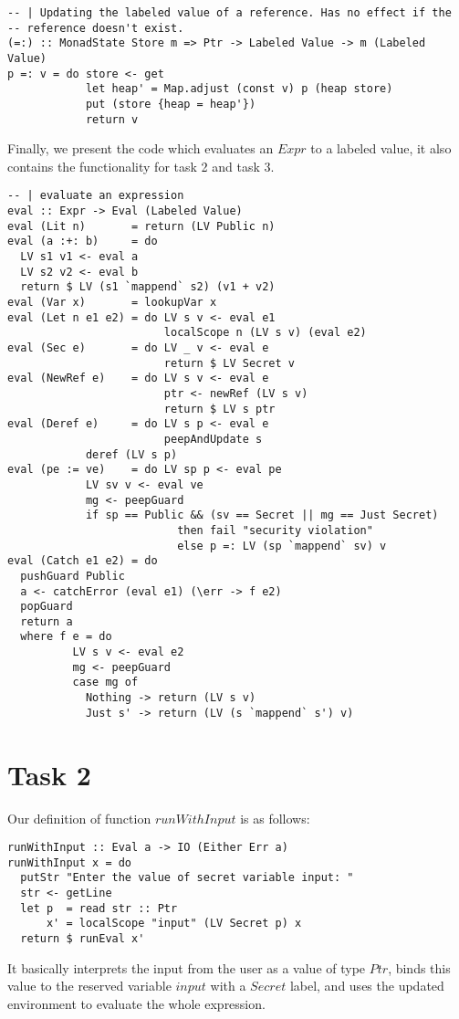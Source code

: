 \documentclass[10pt]{article}
\begin{document}
\begin{lstlisting}
-- | Updating the labeled value of a reference. Has no effect if the                                                                                                                          
-- reference doesn't exist.                                                                                                                                                                   
(=:) :: MonadState Store m => Ptr -> Labeled Value -> m (Labeled Value)
p =: v = do store <- get
            let heap' = Map.adjust (const v) p (heap store)
            put (store {heap = heap'})
            return v
\end{lstlisting}
Finally, we present the code which evaluates an $Expr$ to a labeled value, it also contains the functionality for task 2 and task 3.
\begin{lstlisting}
-- | evaluate an expression                                                                                                                                                                   
eval :: Expr -> Eval (Labeled Value)
eval (Lit n)       = return (LV Public n)
eval (a :+: b)     = do
  LV s1 v1 <- eval a
  LV s2 v2 <- eval b
  return $ LV (s1 `mappend` s2) (v1 + v2)
eval (Var x)       = lookupVar x
eval (Let n e1 e2) = do LV s v <- eval e1
                        localScope n (LV s v) (eval e2)
eval (Sec e)       = do LV _ v <- eval e
                        return $ LV Secret v
eval (NewRef e)    = do LV s v <- eval e
                        ptr <- newRef (LV s v)
                        return $ LV s ptr
eval (Deref e)     = do LV s p <- eval e
                        peepAndUpdate s
			deref (LV s p)
eval (pe := ve)    = do LV sp p <- eval pe
			LV sv v <- eval ve
			mg <- peepGuard
			if sp == Public && (sv == Secret || mg == Just Secret)
                          then fail "security violation"
                          else p =: LV (sp `mappend` sv) v
eval (Catch e1 e2) = do
  pushGuard Public
  a <- catchError (eval e1) (\err -> f e2)
  popGuard
  return a
  where f e = do
          LV s v <- eval e2
          mg <- peepGuard
          case mg of
            Nothing -> return (LV s v)
            Just s' -> return (LV (s `mappend` s') v)
\end{lstlisting}

\section*{Task 2}
Our definition of function $runWithInput$ is as follows:
\begin{lstlisting}
runWithInput :: Eval a -> IO (Either Err a)
runWithInput x = do
  putStr "Enter the value of secret variable input: "
  str <- getLine
  let p  = read str :: Ptr
      x' = localScope "input" (LV Secret p) x
  return $ runEval x'
\end{lstlisting}
It basically interprets the input from the user as a value of type $Ptr$, binds this value to the reserved variable $input$ with a $Secret$ label, and uses the updated environment to evaluate the whole expression.
\end{document}
